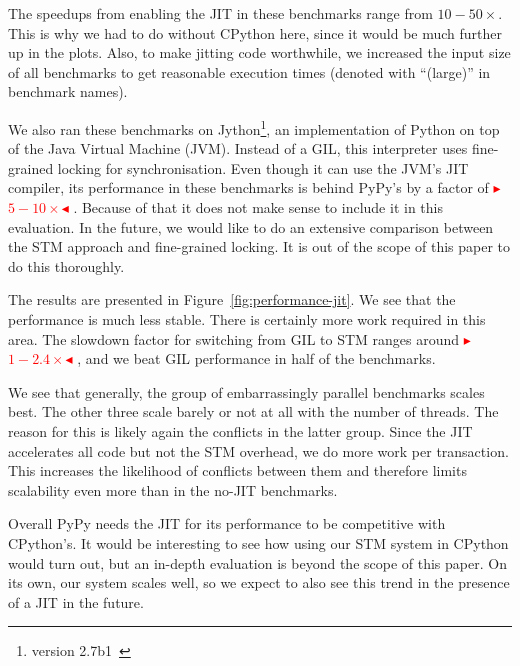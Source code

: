 \documentclass{sigplanconf}
\newcommand{\mynote}[2]{%
  \textcolor{red}{%
    \fbox{\bfseries\sffamily\scriptsize#1}%
    {\small$\blacktriangleright$\textsf{\emph{#2}}$\blacktriangleleft$}%
  }%
}
\newcommand\remi[1]{\mynote{Remi}{#1}}
\begin{document}
The speedups from enabling the JIT in these benchmarks range from
$10-50\times$. This is why we had to do without CPython here, since it
would be much further up in the plots. Also, to make jitting
code worthwhile, we increased the input size of all benchmarks to get
reasonable execution times (denoted with ``(large)'' in benchmark names).

We also ran these benchmarks on Jython\footnote{version
2.7b1~\cite{webjython}}, an implementation of Python on top of the
Java Virtual Machine (JVM).  Instead of a GIL, this interpreter uses
fine-grained locking for synchronisation. Even though it can use the
JVM's JIT compiler, its performance in these benchmarks is behind
PyPy's by a factor of \remi{$5-10\times$}. Because of that it does not
make sense to include it in this evaluation. In the future, we would
like to do an extensive comparison between the STM approach and
fine-grained locking. It is out of the scope of this paper to do
this thoroughly.

The results are presented in Figure~\ref{fig:performance-jit}. We
see that the performance is much less stable. There is certainly more
work required in this area. The slowdown factor for switching from GIL
to STM ranges around \remi{$1-2.4\times$}, and we beat GIL performance
in half of the benchmarks.

We see that generally, the group of embarrassingly parallel benchmarks scales
best. The other three scale barely or not at all with the number of
threads. The reason for this is likely again the conflicts in the
latter group. Since the JIT accelerates all code but not the STM
overhead, we do more work per transaction. This increases the
likelihood of conflicts between them and therefore limits scalability
even more than in the no-JIT benchmarks.

Overall PyPy needs the JIT  for its performance to be
competitive with CPython's. It would be interesting to see how using
our STM system in CPython would turn out, but an in-depth evaluation is
beyond the scope of this paper. On
its own, our system scales well, so we expect to also see this trend in the presence of a
JIT in the future.
\end{document}
